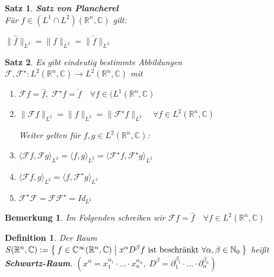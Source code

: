 \documentclass[11pt]{memoir}
\theoremstyle{changebreak}
\newtheorem{Definition}{Definition}[chapter]
\newtheorem{Bemerkung}{Bemerkung}[chapter]
\newtheorem{Satz}{Satz}[chapter]
\begin{document}
\begin{Satz}
\emph{\textbf{Satz von Plancherel} }\\
Für $f \in (L^1 \cap L^2)(\mathbb R^n, \mathbb C)$ gilt:
\begin{center}
	$\|\hat f \|_{L^2} = \|f\|_{L^2} = \|\check f\|_{L^2}$
\end{center}
\end{Satz}

\begin{Satz}
Es gibt eindeutig bestimmte Abbildungen $\mathscr F, \mathscr F^\star: L^2(\mathbb R^n, \mathbb C) \rightarrow L^2(\mathbb R^n, \mathbb C)$ mit 
\begin{enumerate}
	\item $\mathscr F f= \hat f, \; \mathscr F^\star f = \check f \quad \forall f \in (L^1(\mathbb R^n, \mathbb C)$
	\item $\|\mathscr F f\|_{L^2} = \|f\|_{L^2} = \|\mathscr F^\star f\|_{L^2} \quad \forall f \in L^2(\mathbb R^n, \mathbb C)$ \\
	\par\bigskip
	Weiter gelten für $f, g \in L^2(\mathbb R^n, \mathbb C)$:
	\item $\langle \mathscr F f, \mathscr F g\rangle_{L^2} = \langle f, g \rangle_{L^2} = \langle \mathscr F^\star f, \mathscr F^\star g\rangle_{L^2}$
	\item $\langle \mathscr F f, g \rangle_{L^2} = \langle f, \mathscr F^\star g \rangle_{L^2}$
	\item $\mathscr F^\star \mathscr F = \mathscr F \mathscr F^\star = $Id$_{L^2}$
\end{enumerate}
\end{Satz}



\begin{Bemerkung}
Im Folgenden schreiben wir $\mathscr F f = \hat f \quad \forall f \in L^2(\mathbb R^n, \mathbb C)$
\end{Bemerkung}


\begin{Definition}
Der Raum $S(\mathbb R^n, \mathbb C):= \Set{f \in \mathbb C^\infty(\mathbb R^n, \mathbb C) | x^\alpha D^\beta f \text{ ist beschränkt } \forall \alpha, \beta \in \mathbb N_0}$ heißt \textbf{Schwartz-Raum}.
$\left(x^\alpha = x_1^{\alpha_1} \cdotp ... \cdotp x_n^{\alpha_n}, \; D^\beta = \partial_1^{\beta_1} \cdotp ... \cdotp \partial_n^{\beta_n}\right)$
\end{Definition}
\end{document}
